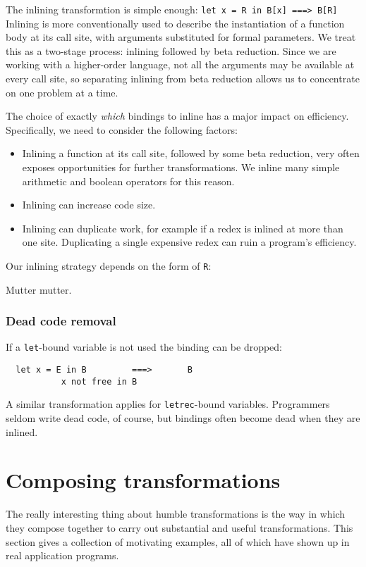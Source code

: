 \documentclass[11pt]{article}
\begin{document}
The inlining transformtion is simple enough:
\texttt{let x = R in B[x]  ===>   B[R]}
Inlining is more conventionally used to describe the instantiation of a function
body at its call site, with arguments substituted for formal parameters.  We treat
this as a two-stage process: inlining followed by beta reduction.  Since we are
working with a higher-order language, not all the arguments may be available at every
call site, so separating inlining from beta reduction allows us to concentrate on
one problem at a time.

The choice of exactly {\em which} bindings to inline has a major impact on efficiency.
Specifically, we need to consider the following factors:
\begin{itemize}
\item
Inlining a function at its call site, followed by some beta reduction, 
very often exposes opportunities for further transformations.
We inline many simple arithmetic and boolean operators for this reason.
\item
Inlining can increase code size.
\item
Inlining can duplicate work, for example if a redex is inlined at more than one site.
Duplicating a single expensive redex can ruin a program's efficiency.
\end{itemize}


Our inlining strategy depends on the form of \texttt{R}:

Mutter mutter.


\subsubsection{Dead code removal}

If a \texttt{let}-bound variable is not used the binding can be dropped:
\begin{lstlisting}
  let x = E in B         ===>   	B
		   x not free in B
\end{lstlisting}
A similar transformation applies for \texttt{letrec}-bound variables.
Programmers seldom write dead code, of course, but bindings often become dead when they
are inlined.




\section{Composing transformations}
\label{sect:composing}

The really interesting thing about humble transformations is the way in which
they compose together to carry out substantial and useful transformations.
This section gives a collection of motivating examples, all of which have
shown up in real application programs.
\end{document}
